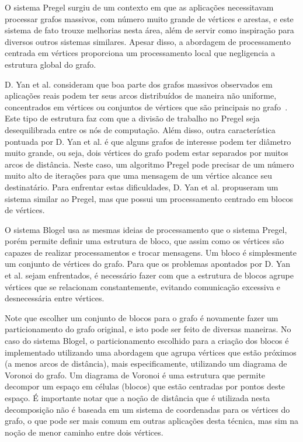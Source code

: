 \documentclass[conference]{IEEEtran}
\begin{document}



O sistema Pregel surgiu de um contexto em que as aplicações necessitavam
processar grafos massivos, com número muito grande de vértices e
arestas, e este sistema de fato trouxe melhorias nesta área, além de
servir como inspiração para diversos outros sistemas similares. Apesar
disso, a abordagem de processamento centrada em vértices proporciona um
processamento local que negligencia a estrutura global do grafo. 

D. Yan et al. consideram que boa parte dos grafos massivos observados em
aplicações reais podem ter seus arcos distribuídos de maneira não
uniforme, concentrados em vértices ou conjuntos de vértices que são
principais no grafo~\cite{blogel}. Este tipo de estrutura faz com que a
divisão de trabalho no Pregel seja desequilibrada entre os nós de
computação. Além disso, outra característica pontuada por D. Yan et al.
é que alguns grafos de interesse podem ter diâmetro muito grande, ou
seja, dois vértices do grafo podem estar separados por muitos arcos de 
distância. Neste caso, um algoritmo Pregel pode precisar de um número
muito alto de iterações para que uma mensagem de um vértice alcance seu
destinatário. Para enfrentar estas dificuldades, D. Yan et al.
propuseram um sistema similar ao Pregel, mas que possui um processamento
centrado em blocos de vértices.

O sistema Blogel usa as mesmas ideias de processamento que o sistema
Pregel, porém permite definir uma estrutura de bloco, que assim como os
vértices são capazes de realizar processamentos e trocar mensagens. Um
bloco é simplesmente um conjunto de vértices do grafo. Para que os
problemas apontados por D. Yan et al. sejam enfrentados, é necessário
fazer com que a estrutura de blocos agrupe vértices que se relacionam
constantemente, evitando comunicação excessiva e desnecessária entre 
vértices.

Note que escolher um conjunto de blocos para o grafo é novamente fazer
um particionamento do grafo original, e isto pode ser feito de diversas
maneiras. No caso do sistema Blogel, o particionamento escolhido para a 
criação dos blocos é implementado utilizando uma abordagem que agrupa
vértices que estão próximos (a menos arcos de distância), mais
especificamente, utilizando um diagrama de Voronoi do grafo. Um diagrama
de Voronoi é uma estrutura que permite decompor um espaço em células
(blocos) que estão centradas por pontos deste espaço. É importante notar
que a noção de distância que é utilizada nesta decomposição não é
baseada em um sistema de coordenadas para os vértices do grafo, o que
pode ser mais comum em outras aplicações desta técnica, mas sim na noção
de menor caminho entre dois vértices.
\end{document}
